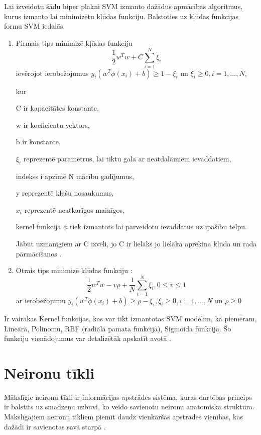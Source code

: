 \documentclass[12pt,paper=A4]{report}
\begin{document}
Lai izveidotu šādu hiper plakni SVM izmanto dažādus apmācības algoritmus, kurus izmanto lai minimizētu kļūdas funkciju. Balstoties uz kļūdas funkcijas formu SVM iedalās\cite{http://www.statsoft.com/Textbook/Support-Vector-Machines}:
\begin{enumerate}
\item	Pirmais tips minimizē kļūdas funkciju 
\begin{equation}
\frac{1}{2}w^T w+C\sum\limits_{i=1}^N \xi_i
\end{equation}
 ievērojot ierobežojumus  $y_i(w^T \phi(x_i)+b)\geq 1 - \xi_i $ un $\xi_i\geq0,i=1,...,N $,

 kur 

C ir kapacitātes konstante, 

w ir koeficientu vektors, 

b ir konstante,

$\xi_i$ reprezentē parametrus, lai tiktu gala ar neatdalāmiem ievaddatiem,

indekss i apzīmē N mācību gadījumus,

y reprezentē klašu nosaukumus, 

$x_i$ reprezentē neatkarīgos mainīgos,

kernel funkcija $\phi$ tiek izmantots lai pārveidotu ievaddatus uz īpašību telpu.

Jābūt uzmanīgiem ar C izvēli, jo C ir lielāks jo lielāka aprēķina kļūda un rada pārmācīšanos \cite{http://www.statsoft.com/Textbook/Support-Vector-Machines}.  


\item	Otrais tips minimizē kļūdas funkciju \cite{dtw47}:
\begin{equation}
\frac{1}{2}w^T w-v\rho+\frac{1}{N}\sum\limits_{i=1}^N \xi_i,  0\leq v \leq 1
\end{equation}
 ar ierobežojumu   $y_i(w^T \phi(x_i)+b)\geq \rho - \xi_i,\xi_i\geq0,i=1,...,N $ un $ \rho \geq 0$


\end{enumerate}

Ir vairākas Kernel funkcijas, kas var tikt izmantotas SVM modelim, kā piemēram, Lineārā, Polinomu, RBF (radiālā pamata funkcija), Sigmoida funkcija. Šo funkciju vienādojumus var detalizētāk apskatīt avotā \cite{dtw47}.


\section{Neironu tīkli}
Mākslīgie neironu tīkli ir informācijas apstrādes sistēma,
kuras darbības princips ir balstīts uz smadzeņu uzbūvi, ko veido savienotu neironu anatomiskā struktūra. Mākslīgajiem neironu tīkliem
piemīt daudz vienkāršas apstrādes vienības,
kas dažādi ir savienotas savā starpā \cite{dtw18}.
\end{document}
